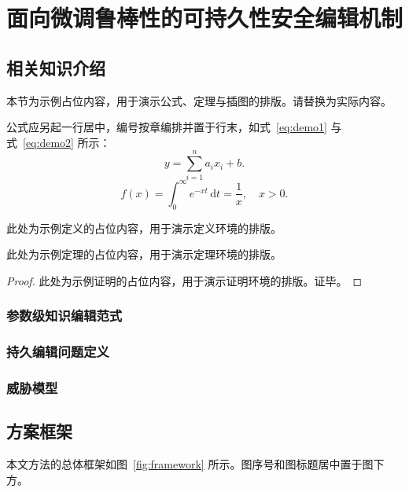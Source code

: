 \chapter{面向微调鲁棒性的可持久性安全编辑机制}\label{chap:method}

\section{相关知识介绍}
本节为示例占位内容，用于演示公式、定理与插图的排版。请替换为实际内容。

公式应另起一行居中，编号按章编排并置于行末，如式~\eqref{eq:demo1} 与式~\eqref{eq:demo2}
所示：
\begin{equation}\label{eq:demo1}
  y = \sum_{i=1}^{n} a_i x_i + b.
\end{equation}
\begin{equation}\label{eq:demo2}
  f(x) = \int_{0}^{\infty} e^{-x t}\,\mathrm{d}t = \frac{1}{x}, \quad x>0.
\end{equation}

\begin{definition}[示例定义]\label{def:demo}
此处为示例定义的占位内容，用于演示定义环境的排版。
\end{definition}

\begin{theorem}\label{thm:demo}
此处为示例定理的占位内容，用于演示定理环境的排版。
\end{theorem}
\begin{proof}
此处为示例证明的占位内容，用于演示证明环境的排版。证毕。
\end{proof}

\subsection{参数级知识编辑范式}

\subsection{持久编辑问题定义}

\subsection{威胁模型}

\section{方案框架}
本文方法的总体框架如图~\ref{fig:framework} 所示。图序号和图标题居中置于图下方。

